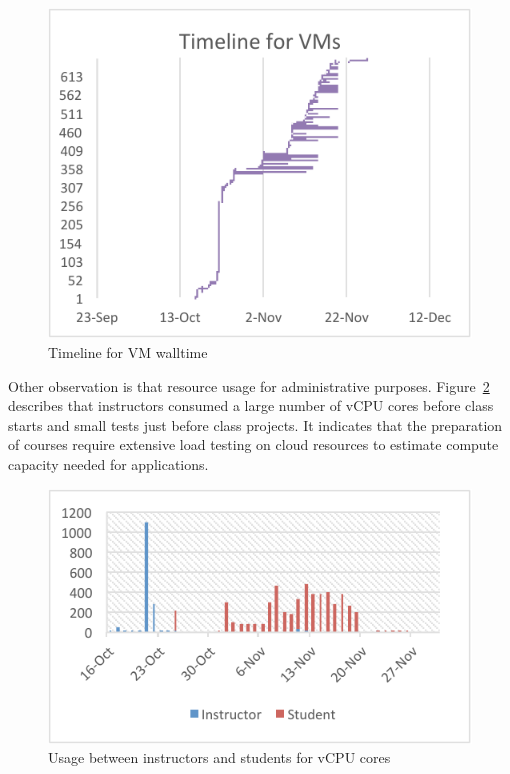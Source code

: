 \documentclass{sig-alternate}
\begin{document}
\begin{figure}[h!] 
  \centering 
    \includegraphics[width=1.0\columnwidth]{images/fig3.pdf} 
  \caption{Timeline for VM walltime}\label{F:fig4} 
\end{figure} 

Other observation is that resource usage for administrative purposes. Figure~\ref{F:fig5} describes that instructors consumed a large number of vCPU cores before class starts and small tests just before class projects. It indicates that the preparation of courses require extensive load testing on cloud resources to estimate compute capacity needed for applications.

 
\begin{figure}[h!] 
  \centering 
    \includegraphics[width=1.0\columnwidth]{images/fig4.pdf} 
  \caption{Usage between instructors and students for vCPU cores}\label{F:fig5} 
\end{figure} 
\end{document}
